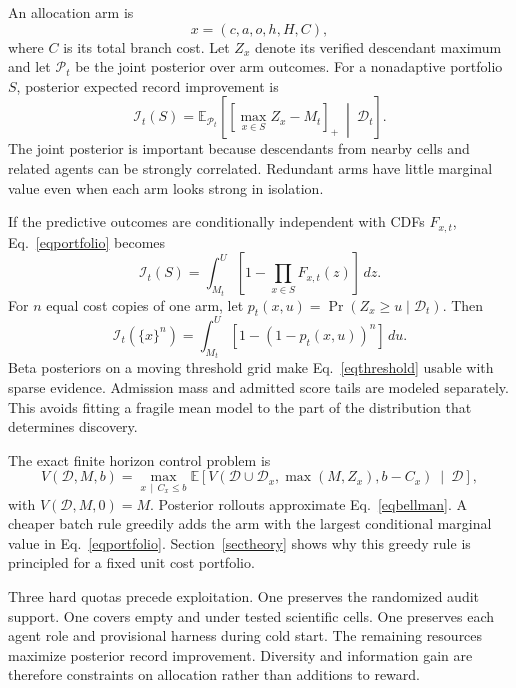 \documentclass{article}
\newcommand{\Data}{\mathcal{D}}
\newcommand{\pos}[1]{\left[#1\right]_{+}}
\begin{document}
An allocation arm is
\begin{equation}
x
=
(c,a,o,h,H,C),
\label{eqarm}
\end{equation}
where $C$ is its total branch cost. Let $Z_x$ denote its verified descendant maximum and let $\mathcal P_t$ be the joint posterior over arm outcomes. For a nonadaptive portfolio $S$, posterior expected record improvement is
\begin{equation}
\mathcal I_t(S)
=
\mathbb E_{\mathcal P_t}\!\left[
\pos{\max_{x\in S}Z_x-M_t}
\ \middle|\ 
\Data_t
\right].
\label{eqportfolio}
\end{equation}
The joint posterior is important because descendants from nearby cells and related agents can be strongly correlated. Redundant arms have little marginal value even when each arm looks strong in isolation.

If the predictive outcomes are conditionally independent with CDFs $F_{x,t}$, Eq.~\eqref{eqportfolio} becomes
\begin{equation}
\mathcal I_t(S)
=
\int_{M_t}^{U}
\left[
1-
\prod_{x\in S}F_{x,t}(z)
\right]
\,dz.
\label{eqrecordintegral}
\end{equation}
For $n$ equal cost copies of one arm, let $p_t(x,u)=\Pr(Z_x\geq u\mid\Data_t)$. Then
\begin{equation}
\mathcal I_t(\{x\}^{n})
=
\int_{M_t}^{U}
\left[
1-\left(1-p_t(x,u)\right)^n
\right]
\,du.
\label{eqthreshold}
\end{equation}
Beta posteriors on a moving threshold grid make Eq.~\eqref{eqthreshold} usable with sparse evidence. Admission mass and admitted score tails are modeled separately. This avoids fitting a fragile mean model to the part of the distribution that determines discovery.

The exact finite horizon control problem is
\begin{equation}
V(\Data,M,b)
=
\max_{x\,\mid\,C_x\leq b}
\mathbb E\!\left[
V\!\left(
\Data\cup\Data_x,
\max(M,Z_x),
b-C_x
\right)
\ \middle|\ 
\Data
\right],
\label{eqbellman}
\end{equation}
with $V(\Data,M,0)=M$. Posterior rollouts approximate Eq.~\eqref{eqbellman}. A cheaper batch rule greedily adds the arm with the largest conditional marginal value in Eq.~\eqref{eqportfolio}. Section~\ref{sectheory} shows why this greedy rule is principled for a fixed unit cost portfolio.

Three hard quotas precede exploitation. One preserves the randomized audit support. One covers empty and under tested scientific cells. One preserves each agent role and provisional harness during cold start. The remaining resources maximize posterior record improvement. Diversity and information gain are therefore constraints on allocation rather than additions to reward.
\end{document}
